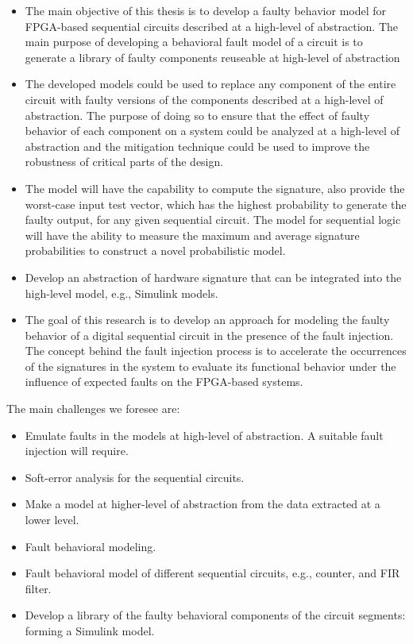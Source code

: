 \begin{itemize}


\item{The main objective of this thesis is to develop a faulty behavior model for FPGA-based
sequential circuits described at a high-level of abstraction. The main purpose of developing a behavioral fault model of a circuit is to generate a library of faulty components reuseable at high-level of abstraction}

\item{The developed models could be used to
replace any component of the entire circuit with faulty versions of the components described
at a high-level of abstraction. The purpose of doing so to ensure that the effect of faulty behavior of each
component on a system could be analyzed at a high-level of abstraction and the mitigation
technique could be used to improve the robustness of critical parts of the design.}


\item{The model will have the capability to compute the signature, also provide the worst-case input test vector, which has the highest probability to generate the faulty output, for any given sequential circuit. The model for sequential logic will have the ability to measure the maximum and average signature probabilities to construct a novel probabilistic model.}

\item{Develop an abstraction of hardware signature that can be integrated into the high-level model, e.g., Simulink models.}

\item{The goal of this research is to develop an approach for modeling the faulty behavior of a
digital sequential circuit in the presence of the fault injection. The concept behind the fault injection process is to accelerate the occurrences of the signatures in the system to evaluate its functional behavior under the influence of expected faults on the
FPGA-based systems.}





\end{itemize}





The main challenges we foresee are:
\begin{itemize}
\item Emulate faults in the models at high-level of abstraction. A suitable fault injection will require. 
\item Soft-error analysis for the sequential circuits.
\item Make a model at higher-level of abstraction from the data extracted at a lower level.
\item Fault behavioral modeling.
\item Fault behavioral model of different sequential circuits, e.g., counter, and FIR filter.
\item Develop a library of the faulty behavioral components of the circuit segments: forming a Simulink model.

\end{itemize}


